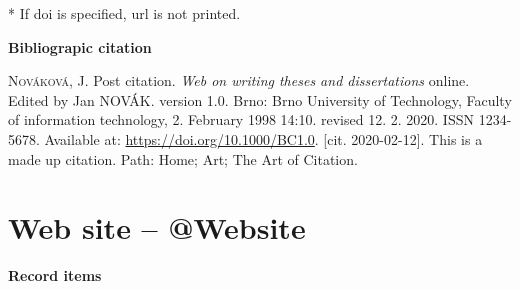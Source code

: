 \bigskip
*  If doi is specified, url is not printed.

\bigskip

\noindent \textbf{Bibliograpic citation}

\medskip

\noindent \textsc{Nováková}, J. Post citation. \textit{Web on writing theses and dissertations} online. Edited by Jan NOVÁK. version 1.0. Brno: Brno University of Technology, Faculty of information technology, 2. February 1998 14:10. revised 12. 2. 2020. ISSN 1234-5678. Available at: \url{https://doi.org/10.1000/BC1.0}. [cit. 2020-02-12]. This is a made up citation.  Path: Home; Art; The Art of Citation.
\newpage
\section*{Web site -- @Website}
\label{pr-website}
\noindent \textbf{Record items}

\medskip

